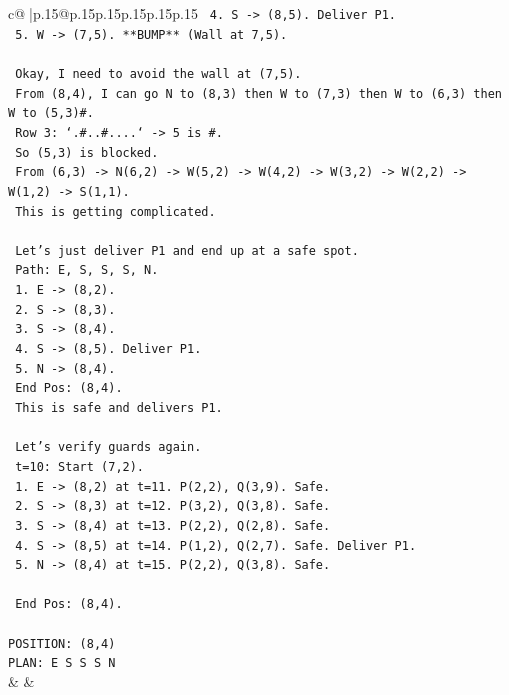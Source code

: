 \documentclass{article}
\begin{document}
{\begin{supertabular}{c@{$\;$}|p{.15\linewidth}@{}p{.15\linewidth}p{.15\linewidth}p{.15\linewidth}p{.15\linewidth}p{.15\linewidth}}
{{{\texttt{   4. S {-}> (8,5). Deliver P1.} \\
\texttt{   5. W {-}> (7,5). **BUMP** (Wall at 7,5).} \\
\\ 
\texttt{   Okay, I need to avoid the wall at (7,5).} \\
\texttt{   From (8,4), I can go N to (8,3) then W to (7,3) then W to (6,3) then W to (5,3)\#.} \\
\texttt{   Row 3: `.\#..\#....` {-}> 5 is \#.} \\
\texttt{   So (5,3) is blocked.} \\
\texttt{   From (6,3) {-}> N(6,2) {-}> W(5,2) {-}> W(4,2) {-}> W(3,2) {-}> W(2,2) {-}> W(1,2) {-}> S(1,1).} \\
\texttt{   This is getting complicated.} \\
\\ 
\texttt{   Let's just deliver P1 and end up at a safe spot.} \\
\texttt{   Path: E, S, S, S, N.} \\
\texttt{   1. E {-}> (8,2).} \\
\texttt{   2. S {-}> (8,3).} \\
\texttt{   3. S {-}> (8,4).} \\
\texttt{   4. S {-}> (8,5). Deliver P1.} \\
\texttt{   5. N {-}> (8,4).} \\
\texttt{   End Pos: (8,4).} \\
\texttt{   This is safe and delivers P1.} \\
\\ 
\texttt{   Let's verify guards again.} \\
\texttt{   t=10: Start (7,2).} \\
\texttt{   1. E {-}> (8,2) at t=11. P(2,2), Q(3,9). Safe.} \\
\texttt{   2. S {-}> (8,3) at t=12. P(3,2), Q(3,8). Safe.} \\
\texttt{   3. S {-}> (8,4) at t=13. P(2,2), Q(2,8). Safe.} \\
\texttt{   4. S {-}> (8,5) at t=14. P(1,2), Q(2,7). Safe. Deliver P1.} \\
\texttt{   5. N {-}> (8,4) at t=15. P(2,2), Q(3,8). Safe.} \\
\\ 
\texttt{   End Pos: (8,4).} \\
\\ 
\texttt{POSITION: (8,4)} \\
\texttt{PLAN: E S S S N} \\
            }
        }
    }
    & & \\ \\


\end{supertabular}}
\end{document}
